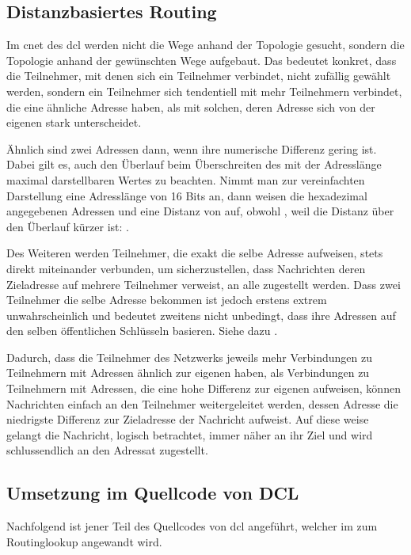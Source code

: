 \subsection{Distanzbasiertes Routing}
Im \gls{cnet} des \gls{dcl} werden nicht die Wege anhand der Topologie gesucht, sondern die
Topologie anhand der gewünschten Wege aufgebaut. Das bedeutet konkret, dass die Teilnehmer, mit
denen sich ein Teilnehmer verbindet, nicht zufällig gewählt werden, sondern ein Teilnehmer sich
tendentiell mit mehr Teilnehmern verbindet, die eine ähnliche Adresse haben, als mit solchen,
deren Adresse sich von der eigenen stark unterscheidet.

Ähnlich sind zwei Adressen dann, wenn ihre numerische Differenz gering ist. Dabei gilt es, auch
den Überlauf beim Überschreiten des mit der Adresslänge maximal darstellbaren Wertes zu beachten.
Nimmt man zur vereinfachten Darstellung eine Adresslänge von 16 Bits an, dann weisen die
hexadezimal angegebenen Adressen  und  eine Distanz von  auf,
obwohl , weil die Distanz über den Überlauf kürzer ist:
.

Des Weiteren werden Teilnehmer, die exakt die selbe Adresse aufweisen, stets direkt miteinander
verbunden, um sicherzustellen, dass Nachrichten deren Zieladresse auf mehrere Teilnehmer verweist,
an alle zugestellt werden. Dass zwei Teilnehmer die selbe Adresse bekommen ist jedoch erstens
extrem unwahrscheinlich und bedeutet zweitens nicht unbedingt, dass ihre Adressen auf den selben
öffentlichen Schlüsseln basieren. Siehe dazu .

Dadurch, dass die Teilnehmer des Netzwerks jeweils mehr Verbindungen zu Teilnehmern mit Adressen
ähnlich zur eigenen haben, als Verbindungen zu Teilnehmern mit Adressen, die eine hohe Differenz
zur eigenen aufweisen, können Nachrichten einfach an den Teilnehmer weitergeleitet werden, dessen
Adresse die niedrigste Differenz zur Zieladresse der Nachricht aufweist. Auf diese weise gelangt
die Nachricht, logisch betrachtet, immer näher an ihr Ziel und wird schlussendlich an den Adressat
zugestellt.

\subsection{Umsetzung im Quellcode von DCL}
Nachfolgend ist jener Teil des Quellcodes von \gls{dcl} angeführt, welcher im 
zum Routinglookup angewandt wird.

